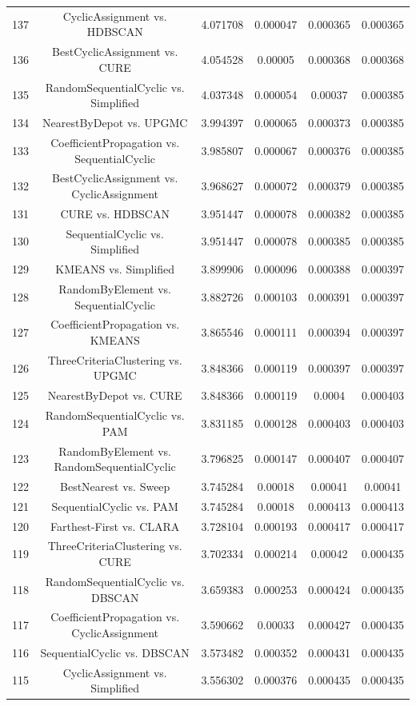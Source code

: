 \documentclass[a4paper,10pt]{article}
\begin{document}
\begin{landscape}
\begin{table}[!htp]
\begin{tabular}{cccccc}
137&CyclicAssignment vs. HDBSCAN&4.071708&0.000047&0.000365&0.000365\\
136&BestCyclicAssignment vs. CURE&4.054528&0.00005&0.000368&0.000368\\
135&RandomSequentialCyclic vs. Simplified&4.037348&0.000054&0.00037&0.000385\\
134&NearestByDepot vs. UPGMC&3.994397&0.000065&0.000373&0.000385\\
133&CoefficientPropagation vs. SequentialCyclic&3.985807&0.000067&0.000376&0.000385\\
132&BestCyclicAssignment vs. CyclicAssignment&3.968627&0.000072&0.000379&0.000385\\
131&CURE vs. HDBSCAN&3.951447&0.000078&0.000382&0.000385\\
130&SequentialCyclic vs. Simplified&3.951447&0.000078&0.000385&0.000385\\
129&KMEANS vs. Simplified&3.899906&0.000096&0.000388&0.000397\\
128&RandomByElement vs. SequentialCyclic&3.882726&0.000103&0.000391&0.000397\\
127&CoefficientPropagation vs. KMEANS&3.865546&0.000111&0.000394&0.000397\\
126&ThreeCriteriaClustering vs. UPGMC&3.848366&0.000119&0.000397&0.000397\\
125&NearestByDepot vs. CURE&3.848366&0.000119&0.0004&0.000403\\
124&RandomSequentialCyclic vs. PAM&3.831185&0.000128&0.000403&0.000403\\
123&RandomByElement vs. RandomSequentialCyclic&3.796825&0.000147&0.000407&0.000407\\
122&BestNearest vs. Sweep&3.745284&0.00018&0.00041&0.00041\\
121&SequentialCyclic vs. PAM&3.745284&0.00018&0.000413&0.000413\\
120&Farthest-First vs. CLARA&3.728104&0.000193&0.000417&0.000417\\
119&ThreeCriteriaClustering vs. CURE&3.702334&0.000214&0.00042&0.000435\\
118&RandomSequentialCyclic vs. DBSCAN&3.659383&0.000253&0.000424&0.000435\\
117&CoefficientPropagation vs. CyclicAssignment&3.590662&0.00033&0.000427&0.000435\\
116&SequentialCyclic vs. DBSCAN&3.573482&0.000352&0.000431&0.000435\\
115&CyclicAssignment vs. Simplified&3.556302&0.000376&0.000435&0.000435\\

\end{tabular}
\end{table}
\end{landscape}
\end{document}
